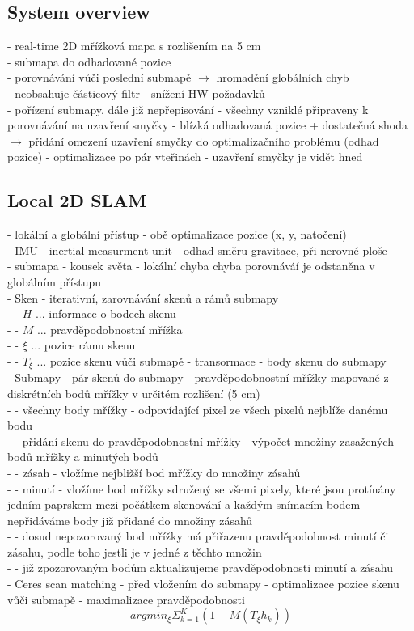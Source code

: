 \documentclass[11pt]{article}
\begin{document}
\subsection{System overview}
- real-time 2D mřížková mapa s rozlišením na 5 cm\\
- submapa do odhadované pozice\\
- porovnávání vůči poslední submapě $\rightarrow$ hromadění globálních chyb\\
- neobsahuje částicový filtr - snížení HW požadavků\\
- pořízení submapy, dále již nepřepisování - všechny vzniklé připraveny k porovnávání na uzavření smyčky - blízká odhadovaná pozice + dostatečná shoda $\rightarrow$ přidání omezení uzavření smyčky do optimalizačního problému (odhad pozice) - optimalizace po pár vteřinách - uzavření smyčky je vidět hned \\

\subsection{Local 2D SLAM}
- lokální a globální přístup - obě optimalizace pozice (x, y, natočení)\\
- IMU - inertial measurment unit - odhad směru gravitace, při nerovné ploše\\
- submapa - kousek světa - lokální chyba chyba porovnáváí je odstaněna v globálním přístupu\\
- Sken - iterativní, zarovnávání skenů a rámů submapy\\
- - $H$ ... informace o bodech skenu\\
- - $M$ ... pravděpodobnostní mřížka\\
- - $\xi$ ... pozice rámu skenu\\
- - $T_{\xi}$ ... pozice skenu vůči submapě - transormace - body skenu do submapy\\
- Submapy - pár skenů do submapy - pravděpodobnostní mřížky mapované z diskrétních bodů mřížky v určitém rozlišení (5 cm)\\
- - všechny body mřížky - odpovídající pixel ze všech pixelů nejblíže danému bodu\\
- - přidání skenu do pravděpodobnostní mřížky - výpočet množiny zasažených bodů mřížky a minutých bodů\\
- - zásah - vložíme nejbližší bod mřížky do množiny zásahů\\
- - minutí - vložíme bod mřížky sdružený se všemi pixely, které jsou protínány jedním paprskem mezi počátkem skenování a každým snímacím bodem - nepřidáváme body již přidané do množiny zásahů\\
- - dosud nepozorovaný bod mřížky má přiřazenu pravděpodobnost minutí či zásahu, podle toho jestli je v jedné z těchto množin\\
- - již zpozorovaným bodům aktualizujeme pravděpodobnosti minutí a zásahu\\
- Ceres scan matching - před vložením do submapy - optimalizace pozice skenu vůči submapě - maximalizace pravděpodobnosti\\
$$argmin_\xi\Sigma^K_{k=1}(1-M(T_{\xi}h_k))$$
\end{document}
